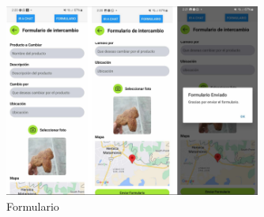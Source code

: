 \documentclass[11pt, a4paper, oneside]{book}
\begin{document}
\begin{figure}[H] 

\centering 

\includegraphics[width=0.75\textwidth]{Pictures/formularionuevo.png} 

\caption{Formulario} 

\end{figure} 
\end{document}
